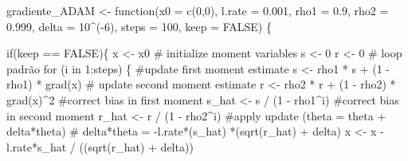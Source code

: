 \documentclass[
  a4paperpaper,
]{article}
\newenvironment{Shaded}{\begin{snugshade}}{\end{snugshade}}
\newcommand{\AttributeTok}[1]{\textcolor[rgb]{0.40,0.45,0.13}{#1}}
\newcommand{\CommentTok}[1]{\textcolor[rgb]{0.37,0.37,0.37}{#1}}
\newcommand{\ConstantTok}[1]{\textcolor[rgb]{0.56,0.35,0.01}{#1}}
\newcommand{\ControlFlowTok}[1]{\textcolor[rgb]{0.00,0.23,0.31}{#1}}
\newcommand{\DecValTok}[1]{\textcolor[rgb]{0.68,0.00,0.00}{#1}}
\newcommand{\FloatTok}[1]{\textcolor[rgb]{0.68,0.00,0.00}{#1}}
\newcommand{\FunctionTok}[1]{\textcolor[rgb]{0.28,0.35,0.67}{#1}}
\newcommand{\NormalTok}[1]{\textcolor[rgb]{0.00,0.23,0.31}{#1}}
\newcommand{\OtherTok}[1]{\textcolor[rgb]{0.00,0.23,0.31}{#1}}
\newcommand{\SpecialCharTok}[1]{\textcolor[rgb]{0.37,0.37,0.37}{#1}}
\begin{document}
\begin{Shaded}
\begin{Highlighting}[]
\NormalTok{gradiente\_ADAM }\OtherTok{\textless{}{-}} \ControlFlowTok{function}\NormalTok{(}\AttributeTok{x0 =} \FunctionTok{c}\NormalTok{(}\DecValTok{0}\NormalTok{,}\DecValTok{0}\NormalTok{), }\AttributeTok{l.rate =} \FloatTok{0.001}\NormalTok{, }\AttributeTok{rho1 =} \FloatTok{0.9}\NormalTok{, }\AttributeTok{rho2 =} \FloatTok{0.999}\NormalTok{, }\AttributeTok{delta =} \DecValTok{10}\SpecialCharTok{\^{}}\NormalTok{(}\SpecialCharTok{{-}}\DecValTok{6}\NormalTok{), }\AttributeTok{steps =} \DecValTok{100}\NormalTok{, }\AttributeTok{keep =} \ConstantTok{FALSE}\NormalTok{) \{}
  
  \ControlFlowTok{if}\NormalTok{(keep }\SpecialCharTok{==} \ConstantTok{FALSE}\NormalTok{)\{}
\NormalTok{    x }\OtherTok{\textless{}{-}}\NormalTok{ x0}
    \CommentTok{\# initialize moment variables}
\NormalTok{    s }\OtherTok{\textless{}{-}} \DecValTok{0}
\NormalTok{    r }\OtherTok{\textless{}{-}} \DecValTok{0}
    \CommentTok{\# loop padrão}
    \ControlFlowTok{for}\NormalTok{ (i }\ControlFlowTok{in} \DecValTok{1}\SpecialCharTok{:}\NormalTok{steps) \{}
      \CommentTok{\#update first moment estimate}
\NormalTok{      s }\OtherTok{\textless{}{-}}\NormalTok{ rho1 }\SpecialCharTok{*}\NormalTok{ s }\SpecialCharTok{+}\NormalTok{ (}\DecValTok{1} \SpecialCharTok{{-}}\NormalTok{ rho1) }\SpecialCharTok{*} \FunctionTok{grad}\NormalTok{(x)}
      \CommentTok{\# update second moment estimate}
\NormalTok{      r }\OtherTok{\textless{}{-}}\NormalTok{ rho2 }\SpecialCharTok{*}\NormalTok{ r }\SpecialCharTok{+}\NormalTok{ (}\DecValTok{1} \SpecialCharTok{{-}}\NormalTok{ rho2) }\SpecialCharTok{*} \FunctionTok{grad}\NormalTok{(x)}\SpecialCharTok{\^{}}\DecValTok{2}
      \CommentTok{\#correct bias in first moment}
\NormalTok{      s\_hat }\OtherTok{\textless{}{-}}\NormalTok{ s }\SpecialCharTok{/}\NormalTok{ (}\DecValTok{1} \SpecialCharTok{{-}}\NormalTok{ rho1}\SpecialCharTok{\^{}}\NormalTok{i)}
      \CommentTok{\#correct bias in second moment}
\NormalTok{      r\_hat }\OtherTok{\textless{}{-}}\NormalTok{ r }\SpecialCharTok{/}\NormalTok{ (}\DecValTok{1} \SpecialCharTok{{-}}\NormalTok{ rho2}\SpecialCharTok{\^{}}\NormalTok{i)}
      \CommentTok{\#apply update (theta = theta + delta*theta)}
      \CommentTok{\# delta*theta = {-}l.rate*(s\_hat) *(sqrt(r\_hat) + delta)}
\NormalTok{      x }\OtherTok{\textless{}{-}}\NormalTok{ x }\SpecialCharTok{{-}}\NormalTok{ l.rate}\SpecialCharTok{*}\NormalTok{s\_hat }\SpecialCharTok{/}\NormalTok{ ((}\FunctionTok{sqrt}\NormalTok{(r\_hat) }\SpecialCharTok{+}\NormalTok{ delta))}

\end{Highlighting}
\end{Shaded}
\end{document}
